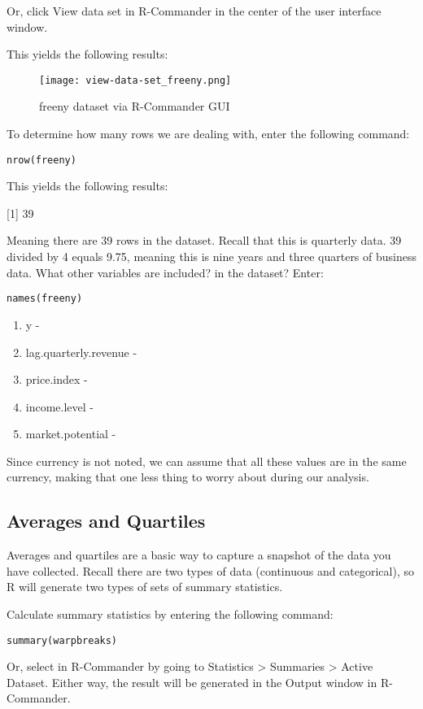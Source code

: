 Or, click View data set in R-Commander in the center of the user interface 
window.

This yields the following results:

\begin{figure}[h!]
\texttt{[image: view-data-set\_freeny.png]}
 \caption{freeny dataset via R-Commander GUI}
 \label{fig:view-data-set_freeny}
\end{figure}

To determine how many rows we are dealing with, enter the following command:

\texttt{nrow(freeny)}

This yields the following results:

[1] 39

Meaning there are 39 rows in the dataset. Recall that this is quarterly data. 
39 divided by 4 equals 9.75, meaning this is nine years and three quarters of 
business data. What other variables are included? in the dataset? Enter: 

\texttt{names(freeny)}

\begin{enumerate}
 \item y - 
 \item lag.quarterly.revenue -  
 \item price.index - 
 \item income.level - 
 \item market.potential - 
\end{enumerate}

Since currency is not noted, we can assume that all these values are in the 
same currency, making that one less thing to worry about during our analysis.

\subsection{Averages and Quartiles}
Averages and quartiles are a basic way to capture a snapshot of the data you have collected. Recall there are two types of data (continuous and categorical), so R will generate two types of sets of summary statistics.

Calculate summary statistics by entering the following command:

\texttt{summary(warpbreaks)}

Or, select in R-Commander by going to Statistics > Summaries > Active Dataset. Either way, the result will be generated in the Output window in R-Commander.

